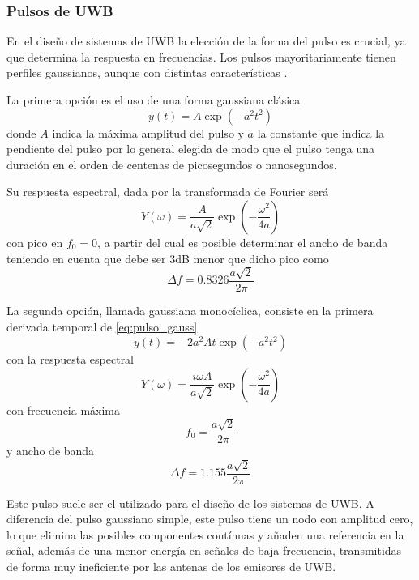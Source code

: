 \subsubsection{Pulsos de UWB}

En el diseño de sistemas de UWB la elección de la forma del pulso es crucial, ya que determina la respuesta en frecuencias.
Los pulsos mayoritariamente tienen perfiles gaussianos, aunque con distintas características \cite{Du}.

La primera opción es el uso de una forma gaussiana clásica
\begin{equation}\label{eq:pulso_gauss}
    y(t) = A\exp(-a^2 t^2)
\end{equation}
donde $A$ indica la máxima amplitud del pulso y $a$ la constante que indica la pendiente del pulso por lo general elegida de modo que el pulso tenga una duración en el orden de centenas de picosegundos o nanosegundos.

Su respuesta espectral, dada por la transformada de Fourier será    
\begin{equation}
    Y(\omega) = \frac{A}{a\sqrt{2}}\exp(-\frac{\omega^2}{4a})
\end{equation}
con pico en $f_0=0$, a partir del cual es posible determinar el ancho de banda teniendo en cuenta que debe ser 3dB menor que dicho pico como
\begin{equation}
    \Delta f = 0.8326\frac{a\sqrt{2}}{2\pi}
\end{equation}

La segunda opción, llamada gaussiana monocíclica, consiste en la primera derivada temporal de \eqref{eq:pulso_gauss}
\begin{equation}
    y(t) = -2 a^2 At\exp(-a^2 t^2)
\end{equation}
con la respuesta espectral
\begin{equation}
    Y(\omega) = \frac{i\omega A}{a\sqrt{2}}\exp(-\frac{\omega^2}{4a})
\end{equation}
con frecuencia máxima
\begin{equation}
    f_0 = \frac{a\sqrt{2}}{2\pi}
\end{equation}
y ancho de banda
\begin{equation}
    \Delta f = 1.155\frac{a\sqrt{2}}{2\pi}
\end{equation}

Este pulso suele ser el utilizado para el diseño de los sistemas de UWB.
A diferencia del pulso gaussiano simple, este pulso tiene un nodo con amplitud cero, lo que elimina las posibles componentes contínuas y añaden una referencia en la señal, además de una menor energía en señales de baja frecuencia, transmitidas de forma muy ineficiente por las antenas de los emisores de UWB.

